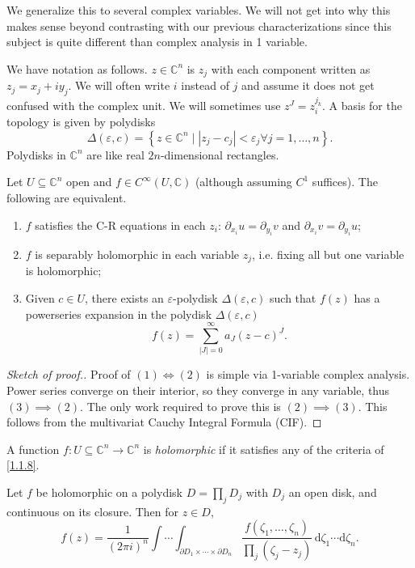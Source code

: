 We generalize this to several complex variables. We will not get into why this makes sense beyond contrasting with our previous characterizations since this subject is quite different than complex analysis in 1 variable.

We have notation as follows. $z\in\mathbb{C} ^n$ is $z_j$ with each component written as $z_j=x_j+iy_j$. We will often write $i$ instead of $j$ and assume it does not get confused with the complex unit. We will sometimes use $z^J=z_i^{j_k} $. A basis for the topology is given by polydisks
\[
	\Delta (\varepsilon ,c)=\left\{ z\in\mathbb{C} ^n\mid \left| z_j-c_j \right| <\varepsilon _j\forall j=1, \ldots ,n \right\} 
.\]
Polydisks in $\mathbb{C} ^n$ are like real $2n$-dimensional rectangles.

\begin{theorem}\label{1.1.8}
	Let $U\subseteq \mathbb{C} ^n$ open and $f\in C^\infty (U,\mathbb{C} )$ (although assuming $C^1$ suffices). The following are equivalent.
	\begin{enumerate}
		\item $f$ satisfies the C-R equations in each $z_i$: $\partial _{x_i}u=\partial _{y_i} v$ and $\partial _{x_i} v=\partial _{y_i} u$;
		\item $f$ is separably holomorphic in each variable $z_j$, i.e. fixing all but one variable is holomorphic;
		\item Given $c\in U$, there exists an $\varepsilon $-polydisk $\Delta (\varepsilon ,c)$ such that $f(z)$ has a powerseries expansion in the polydisk $\Delta (\varepsilon ,c)$
			\[
				f(z)=\sum_{\left| J \right| =0}^{\infty} a_J(z-c)^J
			.\]
	\end{enumerate}
\end{theorem}
\begin{proof}[Sketch of proof.]
	Proof of $(1)\iff (2)$ is simple via 1-variable complex analysis. Power series converge on their interior, so they converge in any variable, thus $(3)\implies (2)$. The only work required to prove this is $(2)\implies (3)$. This follows from the multivariat Cauchy Integral Formula (CIF).
\end{proof}


\begin{definition}\label{1.1.9}
	A function $f : U\subseteq \mathbb{C} ^n \to \mathbb{C}^n $ is \emph{holomorphic} if it satisfies any of the criteria of \cref{1.1.8}.
\end{definition}

\begin{theorem}\label{1.1.10}
	Let $f$ be holomorphic on a polydisk $D=\prod_{j} D_j$ with $D_j$ an open disk, and continuous on its closure. Then for $z\in D$,
	\[
		f(z)=\frac{1}{(2\pi i)^n} \int \cdots \int_{\partial D_1\times \cdots \times \partial D_n} \frac{f(\zeta_1, \ldots ,\zeta _n)}{\prod_{j} (\zeta _j-z_j)}  \,\mathrm{d} \zeta _1 \cdots \mathrm{d} \zeta _n
	.\]
\end{theorem}

